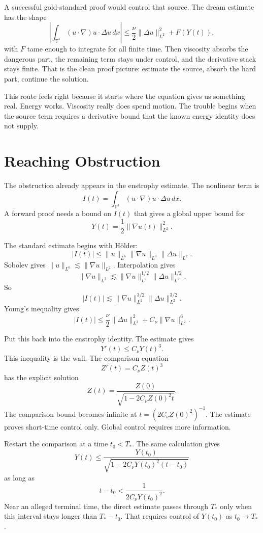 \documentclass[11pt]{article}
\begin{document}
A successful gold-standard proof would control that source.
The dream estimate has the shape
\[
  \left|\int_{\mathbb T^3}(u\cdot\nabla)u\cdot\Delta u\,dx\right|
  \le
  \frac{\nu}{2}\|\Delta u\|_{L^2}^2+F(Y(t)),
\]
  with \(F\) tame enough to integrate for all finite time.
Then viscosity absorbs the dangerous part, the remaining term stays under control, and the derivative stack stays finite.
That is the clean proof picture: estimate the source, absorb the hard part, continue the solution.

This route feels right because it starts where the equation gives us something real.
Energy works.
Viscosity really does spend motion.
The trouble begins when the source term requires a derivative bound that the known energy identity does not supply.

\section{Reaching Obstruction}

The obstruction already appears in the enstrophy estimate.
The nonlinear term is
\[
  I(t)=\int_{\mathbb T^3}(u\cdot\nabla)u\cdot\Delta u\,dx .
\]
A forward proof needs a bound on \(I(t)\) that gives a global upper bound for
\[
  Y(t)=\frac12\|\nabla u(t)\|_{L^2}^2.
\]

The standard estimate begins with H\"older:
\[
  |I(t)|
  \le
  \|u\|_{L^6}\|\nabla u\|_{L^3}\|\Delta u\|_{L^2}.
\]
Sobolev gives \(\|u\|_{L^6}\lesssim \|\nabla u\|_{L^2}\).
Interpolation gives
\[
  \|\nabla u\|_{L^3}
  \lesssim
  \|\nabla u\|_{L^2}^{1/2}\|\Delta u\|_{L^2}^{1/2}.
\]
So
\[
  |I(t)|\lesssim
  \|\nabla u\|_{L^2}^{3/2}\|\Delta u\|_{L^2}^{3/2}.
\]
Young's inequality gives
\[
  |I(t)|
  \le
  \frac{\nu}{2}\|\Delta u\|_{L^2}^2
  +C_\nu\|\nabla u\|_{L^2}^6.
\]

Put this back into the enstrophy identity.
The estimate gives
\[
  Y'(t)\le C_\nu Y(t)^3.
\]
This inequality is the wall.
The comparison equation
\[
  Z'(t)=C_\nu Z(t)^3
\]
has the explicit solution
\[
  Z(t)=\frac{Z(0)}{\sqrt{1-2C_\nu Z(0)^2t}}.
\]
The comparison bound becomes infinite at \(t=(2C_\nu Z(0)^2)^{-1}\).
The estimate proves short-time control only.
Global control requires more information.

Restart the comparison at a time \(t_0<T_*\).
The same calculation gives
\[
  Y(t)\le
  \frac{Y(t_0)}
  {\sqrt{1-2C_\nu Y(t_0)^2(t-t_0)}}
\]
as long as
\[
  t-t_0 < \frac{1}{2C_\nu Y(t_0)^2}.
\]
Near an alleged terminal time, the direct estimate passes through \(T_*\) only when this interval stays longer than \(T_*-t_0\).
That requires control of \(Y(t_0)\) as \(t_0\to T_*\).
\end{document}

